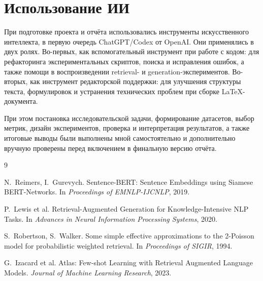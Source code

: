 \documentclass[12pt,a4paper]{article}
\begin{document}
\section{Использование ИИ}

При подготовке проекта и отчёта использовались инструменты искусственного интеллекта, в первую очередь ChatGPT/Codex от OpenAI. Они применялись в двух ролях. Во-первых, как вспомогательный инструмент при работе с кодом: для рефакторинга экспериментальных скриптов, поиска и исправления ошибок, а также помощи в воспроизведении retrieval- и generation-экспериментов. Во-вторых, как инструмент редакторской поддержки: для улучшения структуры текста, формулировок и устранения технических проблем при сборке \LaTeX-документа.

При этом постановка исследовательской задачи, формирование датасетов, выбор метрик, дизайн экспериментов, проверка и интерпретация результатов, а также итоговые выводы были выполнены мной самостоятельно и дополнительно вручную проверены перед включением в финальную версию отчёта.

\begin{thebibliography}{9}

N.~Reimers, I.~Gurevych.
\newblock Sentence-BERT: Sentence Embeddings using Siamese BERT-Networks.
\newblock In \emph{Proceedings of EMNLP-IJCNLP}, 2019.

P.~Lewis et al.
\newblock Retrieval-Augmented Generation for Knowledge-Intensive NLP Tasks.
\newblock In \emph{Advances in Neural Information Processing Systems}, 2020.

S.~Robertson, S.~Walker.
\newblock Some simple effective approximations to the 2-Poisson model for probabilistic weighted retrieval.
\newblock In \emph{Proceedings of SIGIR}, 1994.

G.~Izacard et al.
\newblock Atlas: Few-shot Learning with Retrieval Augmented Language Models.
\newblock \emph{Journal of Machine Learning Research}, 2023.

\end{thebibliography}
\end{document}

